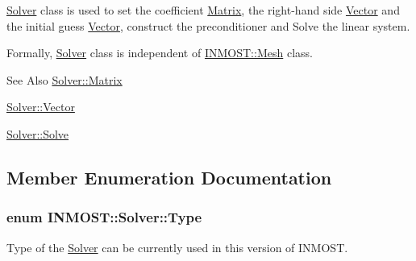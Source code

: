 \hyperlink{classINMOST_1_1Solver}{Solver} class is used to set the coefficient \hyperlink{classINMOST_1_1Solver_1_1Matrix}{Matrix}, the right-\/hand side \hyperlink{classINMOST_1_1Solver_1_1Vector}{Vector} and the initial guess \hyperlink{classINMOST_1_1Solver_1_1Vector}{Vector}, construct the preconditioner and Solve the linear system.

Formally, \hyperlink{classINMOST_1_1Solver}{Solver} class is independent of \hyperlink{classINMOST_1_1Mesh}{I\-N\-M\-O\-S\-T\-::\-Mesh} class. \begin{DoxySeeAlso}{See Also}
\hyperlink{classINMOST_1_1Solver_1_1Matrix}{Solver\-::\-Matrix} 

\hyperlink{classINMOST_1_1Solver_1_1Vector}{Solver\-::\-Vector} 

\hyperlink{classINMOST_1_1Solver_ab31891d2c65c0ac93c06b91222b5cbfd}{Solver\-::\-Solve} 
\end{DoxySeeAlso}


\subsection{Member Enumeration Documentation}
\hypertarget{classINMOST_1_1Solver_ad21ba852fdfe10116b40aac266c0309b}{
\subsubsection[{Type}]{\setlength{\rightskip}{0pt plus 5cm}enum {\bf I\-N\-M\-O\-S\-T\-::\-Solver\-::\-Type}}}\label{classINMOST_1_1Solver_ad21ba852fdfe10116b40aac266c0309b}


Type of the \hyperlink{classINMOST_1_1Solver}{Solver} can be currently used in this version of I\-N\-M\-O\-S\-T. 

